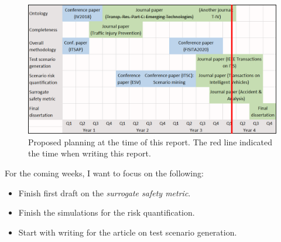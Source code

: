 \documentclass[10pt,final,a4paper,oneside,onecolumn]{article}
\begin{document}
\begin{figure}[t]
	\centering
	\includegraphics[width=\linewidth]{new_planning.png}
	\caption{Proposed planning at the time of this report. The red line indicated the time when writing this report.}
	\label{fig:planning}
\end{figure}

For the coming weeks, I want to focus on the following:
\begin{itemize}
	\item Finish first draft on the \textit{surrogate safety metric}.
	\item Finish the simulations for the risk quantification.
	\item Start with writing for the article on test scenario generation.
\end{itemize}



\printbibliography

%
\end{document}
